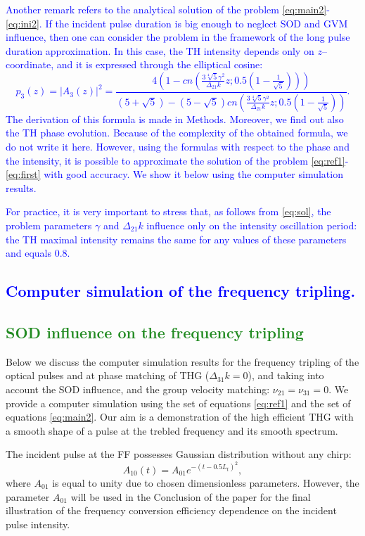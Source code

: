 \documentclass[a4paper, 12pt, onecolumn]{extarticle}
\begin{document}
\textcolor{blue}
{
Another remark refers to the analytical solution of the problem \eqref{eq:main2}-\eqref{eq:ini2}. If the incident pulse duration is big enough to neglect SOD and GVM influence, then one can consider the problem in the framework of the long pulse duration approximation. In this case, the TH intensity depends only on \(z\)--coordinate, and it is expressed through the elliptical cosine:
\begin{equation}
\label{eq:sol}
p_3(z)=|A_3(z)|^2=\frac{4(1-cn(\frac{3\sqrt[4]{5}\gamma^2}{\Delta_{21}k}z; 0.5(1-\frac{1}{\sqrt{5}})))}{(5+\sqrt{5})-(5-\sqrt{5})cn(\frac{3\sqrt[4]{5}\gamma^2}{\Delta_{21}k}z; 0.5(1-\frac{1}{\sqrt{5}}))}.
\end{equation}
The derivation of this formula is made in Methods. Moreover, we find out also the TH phase evolution. Because of the complexity of the obtained formula, we do not write it here. However, using the formulas with respect to the phase and the intensity, it is possible to approximate the solution of the problem \eqref{eq:ref1}-\eqref{eq:first} with good accuracy. We show it below using the computer simulation results.
}

\textcolor{blue}{
For practice, it is very important to stress that, as follows from \eqref{eq:sol}, the problem parameters \(\gamma\) and \(\Delta_{21}k\) influence only on the intensity oscillation period: the TH maximal intensity remains the same for any values of these parameters and equals \(0.8\).
}
\textcolor{blue}{
\section*{Computer simulation of the frequency tripling.}
}
\textcolor{ForestGreen}
{
\section{SOD influence on the frequency tripling}
}
Below we discuss the computer simulation results for the frequency tripling of the optical pulses and at phase matching of THG (\(\Delta_{31}k=0\)), and taking into account the SOD influence, and the group velocity matching: \(\nu_{21}=\nu_{31}=0\). We provide a computer simulation using the set of equations \eqref{eq:ref1} and the set of equations \eqref{eq:main2}. Our aim is a demonstration of the high efficient THG with a smooth shape of a pulse at the trebled frequency and its smooth spectrum. 

The incident pulse at the FF possesses Gaussian distribution without any chirp:
\begin{equation}
A_{10}(t)=A_{01}e^{-(t-0.5L_t)^2},
\end{equation}
where \(A_{01}\) is equal to unity due to chosen dimensionless parameters. However, the parameter \(A_{01}\) will be used in the Conclusion of the paper for the final illustration of the frequency conversion efficiency dependence on the incident pulse intensity.
\end{document}

